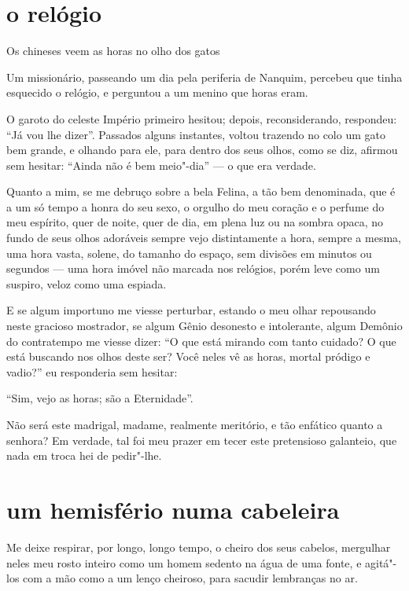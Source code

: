 \quebra\section[O relógio]{o relógio}

Os chineses veem as horas no olho dos gatos

Um missionário, passeando um dia pela periferia de Nanquim, percebeu que
tinha esquecido o relógio, e perguntou a um menino que horas eram.

O garoto do celeste Império primeiro hesitou; depois, reconsiderando,
respondeu: ``Já vou lhe dizer''. Passados
alguns instantes, voltou trazendo no colo um gato bem grande, e
olhando para ele, para dentro dos seus olhos, como se diz, afirmou sem
hesitar: ``Ainda não é bem meio"-dia'' --- o
que era verdade.

Quanto a mim, se me debruço sobre a bela Felina, a tão bem denominada,
que é a um só tempo a honra do seu sexo, o orgulho do meu coração e o
perfume do meu espírito, quer de noite, quer de dia, em plena luz ou na
sombra opaca, no fundo de seus olhos adoráveis sempre vejo
distintamente a hora, sempre a mesma, uma hora vasta, solene, do tamanho do espaço, sem divisões em minutos ou segundos --- uma hora imóvel
não marcada nos relógios, porém leve como um suspiro,
veloz como uma espiada.

E se algum importuno me viesse perturbar, estando o meu olhar
repousando neste gracioso mostrador, se algum Gênio desonesto e
intolerante, algum Demônio do contratempo me viesse dizer:
``O que está mirando com tanto cuidado? O que está
buscando nos olhos deste ser? Você neles vê as horas, mortal pródigo
e vadio?'' eu responderia sem hesitar: 

``Sim,
vejo as horas; são a Eternidade''.

Não será este madrigal, madame, realmente meritório, e tão enfático
quanto a senhora? Em verdade, tal foi meu prazer em tecer este
pretensioso galanteio, que nada em troca hei de pedir"-lhe.

\quebra\section[Um hemisfério numa cabeleira]{um hemisfério numa cabeleira}

Me deixe respirar, por longo, longo tempo, o cheiro dos seus cabelos,
mergulhar neles meu rosto inteiro como um homem sedento na água de uma
fonte, e agitá"-los com a mão como a um lenço cheiroso, para
sacudir lembranças no ar.

